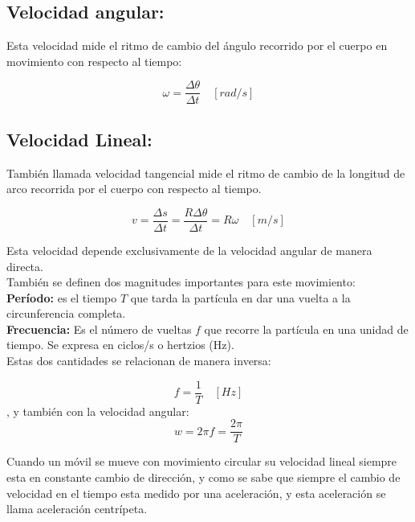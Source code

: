 \subsection{Velocidad angular:}

Esta velocidad mide el ritmo de cambio del ángulo recorrido por el cuerpo en movimiento con respecto al tiempo:

\begin{equation}
\omega = \frac{\Delta \theta}{\Delta t} \quad [rad/s]
\end{equation}

\subsection{Velocidad Lineal:}

También llamada velocidad tangencial mide el ritmo de cambio de la longitud de arco recorrida por el cuerpo con respecto al 
tiempo.

\begin{equation}
v = \frac{\Delta s}{\Delta t} = \frac{R\Delta \theta}{\Delta t} = R\omega \quad [m/s]
\end{equation}

Esta velocidad depende exclusivamente de la velocidad angular de manera directa.\\

También se definen dos magnitudes importantes para este movimiento:\\

\textbf{Período:} es el tiempo $T$ que tarda la partícula en dar una vuelta a la circunferencia completa.\\

\textbf{Frecuencia:} Es el número de vueltas $f$ que recorre la partícula en una unidad de tiempo. Se expresa en ciclos/s o 
hertzios (Hz).\\

Estas dos cantidades se relacionan de manera inversa:

\begin{equation}
f = \frac{1}{T}\quad [Hz]
\end{equation}
, y también con la velocidad angular: 
\begin{equation}
w = 2\pi f = \frac{2\pi}{T}
\end{equation}

Cuando un móvil se mueve con movimiento circular su velocidad lineal siempre esta en constante cambio de dirección, y como se 
sabe que siempre el cambio de velocidad en el tiempo esta medido por una aceleración, y esta aceleración se llama aceleración 
centrípeta.

